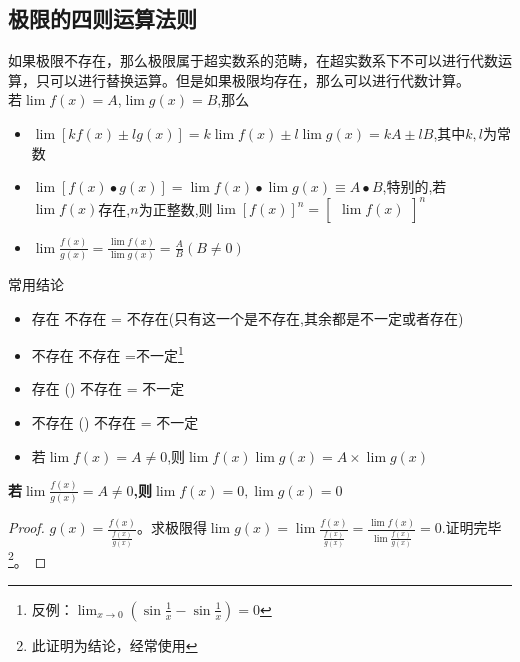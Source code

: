 \documentclass[12pt, a4paper, oneside, UTF8]{ctexbook}
\begin{document}
\begin{sloppypar}
    \subsection{极限的四则运算法则}
    如果极限不存在，那么极限属于超实数系的范畴，在超实数系下不可以进行代数运算，只可以进行替换运算。但是如果极限均存在，那么可以进行代数计算。\\
    若$\lim f(x)=A$,$\lim g(x)=B$,那么
    \begin{itemize}
        \item $\operatorname*{lim}[kf(x)\pm lg(x)]=k\operatorname*{lim}f(x)\pm l\operatorname*{lim}g(x)=kA\pm lB$,其中$k,l$为常数
        \item $\operatorname*{lim}[f(x)\bullet g(x)]=\operatorname*{lim}f(x)\bullet\operatorname*{lim}g(x)\equiv A\bullet B$,特别的,若$\lim f(x)$存在,$n$为正整数,则$\operatorname{lim}[f(x)]^n=\begin{bmatrix}\operatorname{lim}f(x)\end{bmatrix}^n$
        \item $\operatorname*{lim}\frac{f(x)}{g(x)}=\frac{\operatorname*{lim}f(x)}{\operatorname*{lim}g(x)}=\frac{A}{B}(B\neq0)$
    \end{itemize}
    \begin{criterion}{常用结论}{}
        \begin{itemize}
            \item 存在 \pm 不存在 = 不存在(只有这一个是不存在,其余都是不一定或者存在)
            \item 不存在 \pm 不存在 =不一定\footnote{反例：$\lim _{x \to 0}(\sin \frac{1}{x}-\sin \frac{1}{x})=0$}
            \item 存在 \times (\div) 不存在 = 不一定
            \item 不存在 \times (\div) 不存在 = 不一定
            \item 若$\lim f(x) = A \neq 0$,则$\lim f(x)\lim g(x)=A \times \lim g(x)$
        \end{itemize}
    \end{criterion}
    \begin{problem}
    \textbf{若$\lim \frac{f(x)}{g(x)}=A \neq 0$,则$\lim f(x)=0 ,\lim g(x)=0 $}
    \end{problem}
    \begin{proof}
        $g(x)=\frac{f(x)}{\frac{f(x)}{g(x)}}$。求极限得$\lim g(x)=\lim \frac{f(x)}{\frac{f(x)}{g(x)}}=\frac{\lim f(x)}{\lim \frac{f(x)}{g(x)}}=0$.证明完毕\footnote{此证明为结论，经常使用}。
    \end{proof}

\end{sloppypar}
\end{document}
